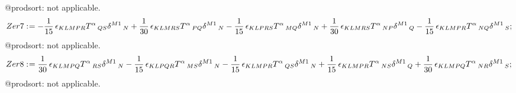 \documentclass[11pt]{article}
\def\specialcolon{\mathrel{\mathop{:}}\hspace{-.5em}}
\begin{document}
@prodsort: not applicable.
\begin{dmath*}[compact, spread=2pt]
Zer7\specialcolon{}=  - \frac{1}{15}\, {\epsilon}_{K L M P R} {T}^{\alpha}\,_{Q S} {\delta}^{M1}\,_{N} + \frac{1}{30}\, {\epsilon}_{K L M R S} {T}^{\alpha}\,_{P Q} {\delta}^{M1}\,_{N} - \frac{1}{15}\, {\epsilon}_{K L P R S} {T}^{\alpha}\,_{M Q} {\delta}^{M1}\,_{N} + \frac{1}{30}\, {\epsilon}_{K L M R S} {T}^{\alpha}\,_{N P} {\delta}^{M1}\,_{Q} - \frac{1}{15}\, {\epsilon}_{K L M P R} {T}^{\alpha}\,_{N Q} {\delta}^{M1}\,_{S};
\end{dmath*}
@prodsort: not applicable.
\begin{dmath*}[compact, spread=2pt]
Zer8\specialcolon{}= \frac{1}{30}\, {\epsilon}_{K L M P Q} {T}^{\alpha}\,_{R S} {\delta}^{M1}\,_{N} - \frac{1}{15}\, {\epsilon}_{K L P Q R} {T}^{\alpha}\,_{M S} {\delta}^{M1}\,_{N} - \frac{1}{15}\, {\epsilon}_{K L M P R} {T}^{\alpha}\,_{Q S} {\delta}^{M1}\,_{N} + \frac{1}{15}\, {\epsilon}_{K L M P R} {T}^{\alpha}\,_{N S} {\delta}^{M1}\,_{Q} + \frac{1}{30}\, {\epsilon}_{K L M P Q} {T}^{\alpha}\,_{N R} {\delta}^{M1}\,_{S};
\end{dmath*}
@prodsort: not applicable.
\end{document}
